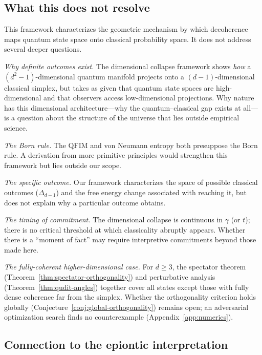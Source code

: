 \documentclass[12pt,a4paper]{article}
\theoremstyle{definition}
\theoremstyle{remark}
\begin{document}
\subsection{What this does not resolve}
\label{sec:not-resolves}

This framework characterizes the geometric mechanism by which decoherence maps quantum state space onto classical probability space.  It does not address several deeper questions.

\emph{Why definite outcomes exist.}  The dimensional collapse framework shows \emph{how} a $(d^2-1)$-dimensional quantum manifold projects onto a $(d-1)$-dimensional classical simplex, but takes as given that quantum state spaces are high-dimensional and that observers access low-dimensional projections.  Why nature has this dimensional architecture---why the quantum--classical gap exists at all---is a question about the structure of the universe that lies outside empirical science.

\emph{The Born rule.} The QFIM and von Neumann entropy both presuppose the Born rule.  A derivation from more primitive principles \cite{zurek2003decoherence} would strengthen this framework but lies outside our scope.

\emph{The specific outcome.} Our framework characterizes the space of possible classical outcomes ($\Delta_{d-1}$) and the free energy change associated with reaching it, but does not explain why a particular outcome obtains.

\emph{The timing of commitment.} The dimensional collapse is continuous in $\gamma$ (or $t$); there is no critical threshold at which classicality abruptly appears.  Whether there is a ``moment of fact'' may require interpretive commitments beyond those made here.

\emph{The fully-coherent higher-dimensional case.} For $d \geq 3$, the spectator theorem (Theorem~\ref{thm:spectator-orthogonality}) and perturbative analysis (Theorem~\ref{thm:qudit-angles}) together cover all states except those with fully dense coherence far from the simplex.  Whether the orthogonality criterion holds globally (Conjecture~\ref{conj:global-orthogonality}) remains open; an adversarial optimization search finds no counterexample (Appendix~\ref{app:numerics}).

\subsection{Connection to the epiontic interpretation}
\label{sec:epiontic}
\end{document}

